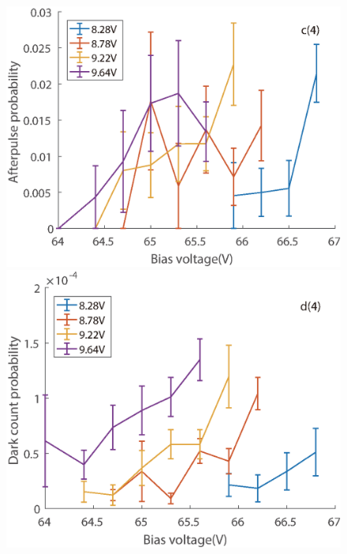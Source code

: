 \documentclass[%
 reprint,
superscriptaddress,
 amsmath,amssymb,
 aps,
]{revtex4-1}
\begin{document}
\begin{figure}
\begin{minipage}{0.24\linewidth}
\includegraphics[width = 1\textwidth]{figure/105M/afterpulse1.eps}%
\end{minipage}
\begin{minipage}{0.24\linewidth}
\centering
\includegraphics[width = 1\textwidth]{figure/105M/darkcount.eps}%
\end{minipage}


\end{figure}
\end{document}

